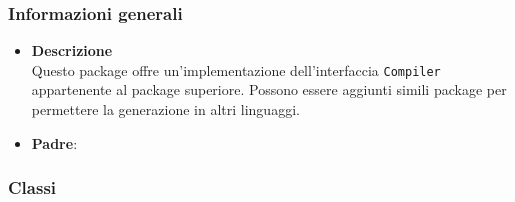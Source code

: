 \subsubsection{Informazioni generali}
\begin{itemize}
\item \textbf{Descrizione}\\
Questo package offre un'implementazione dell'interfaccia \texttt{Compiler} appartenente al package superiore. Possono essere aggiunti simili package per permettere la generazione in altri linguaggi.
\item \textbf{Padre}: \hyperref[\nogloxy{swedesigner::server::compiler}]{}
\end{itemize}
\subsubsection{Classi}
\label{\nogloxy{swedesigner::server::compiler::java::JavaCompiler}}
\begin{figure}[h]
\centering
{}
\caption{}
\end{figure}
\FloatBarrier
